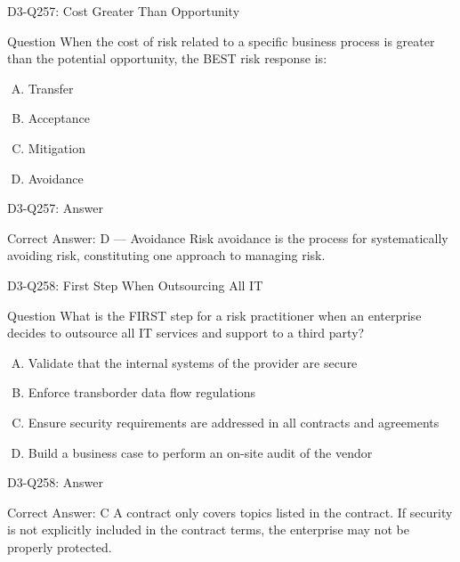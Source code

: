 \documentclass{beamer}
\begin{document}
	\begin{frame}{D3-Q257: Cost Greater Than Opportunity}
		\begin{block}{Question}
			When the cost of risk related to a specific business process is greater than the potential opportunity, the BEST risk response is:
		\end{block}
		\begin{enumerate}[(A)]
			\item Transfer
			\item Acceptance
			\item Mitigation
			\item Avoidance
		\end{enumerate}
	\end{frame}
	\begin{frame}{D3-Q257: Answer}
		\begin{block}{Correct Answer: D --- Avoidance}
			Risk avoidance is the process for systematically avoiding risk, constituting one approach to managing risk.
		\end{block}
	\end{frame}
	
	\begin{frame}{D3-Q258: First Step When Outsourcing All IT}
		\begin{block}{Question}
			What is the FIRST step for a risk practitioner when an enterprise decides to outsource all IT services and support to a third party?
		\end{block}
		\begin{enumerate}[(A)]
			\item Validate that the internal systems of the provider are secure
			\item Enforce transborder data flow regulations
			\item Ensure security requirements are addressed in all contracts and agreements
			\item Build a business case to perform an on-site audit of the vendor
		\end{enumerate}
	\end{frame}
	\begin{frame}{D3-Q258: Answer}
		\begin{block}{Correct Answer: C}
			A contract only covers topics listed in the contract. If security is not explicitly included in the contract terms, the enterprise may not be properly protected.
		\end{block}
	\end{frame}
	
\end{document}
